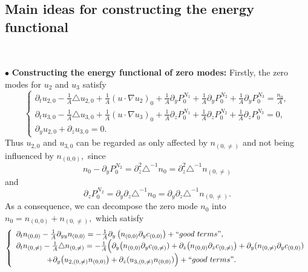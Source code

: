 \documentclass[12pt, reqno]{amsart}
\numberwithin{equation}{section}
\begin{document}
	
	\subsection{Main ideas for constructing the energy functional}\
	
	$\bullet$ {\bf Constructing the energy functional of zero modes:}
	Firstly, the zero modes for $u_{2}$ and $u_3$ satisfy 
	\begin{equation*}
		\left\{
		\begin{array}{lr}
			\partial_tu_{2,0}-\frac{1}{A}\triangle u_{2,0}
			+\frac{1}{A}(u\cdot\nabla u_{2})_0
			+\frac{1}{A}\partial_yP^{N_1}_0
			+\frac{1}{A}\partial_y P^{N_2}_0+\frac{1}{A}\partial_y P^{N_3}_0=\frac{n_0}{A}, \\
			\partial_tu_{3,0}-\frac{1}{A}\triangle u_{3,0}
			+\frac{1}{A}(u\cdot\nabla u_3)_0
			+\frac{1}{A}\partial_zP^{N_1}_0
			+\frac{1}{A}\partial_z P^{N_2}_0
			+\frac{1}{A}\partial_z P^{N_3}_0=0,\\
			\partial_yu_{2,0}+\partial_zu_{3,0}=0.
		\end{array}
		\right.
	\end{equation*}	
	Thus $u_{2,0}$ and $u_{3,0}$ can be regarded as only affected by $n_{(0,\neq)}$
	and not being influenced by $n_{(0,0)},$ since  $$n_0-\partial_yP^{N_2}_{0}
	=\partial_z^2\triangle^{-1}n_{0}=\partial_z^2\triangle^{-1}n_{(0,\neq)}$$
	and
	$$\partial_zP^{N_2}_{0}=\partial_y\partial_z\triangle^{-1}n_0
	=\partial_y\partial_z\triangle^{-1}n_{(0,\neq)}.$$
	As a consequence, we can decompose the zero mode $n_{0}$ into $n_0=n_{(0,0)}+n_{(0,\neq)},$ which satisfy
	\begin{equation}\label{eq:n0'}
		\left\{
		\begin{array}{lr}
			\partial_t n_{(0,0)}-\frac{1}{A}\partial_{yy} n_{(0,0)}=-\frac{1}{A}\partial_{y}\left(n_{(0,0)}
			\partial_{y}c_{(0,0)}\right)+``{\rm good~terms}",\\
			\partial_t n_{(0,\neq)}-\frac{1}{A}\triangle n_{(0,\neq)}
			=-\frac{1}{A}\Big(\partial_y\big(n_{(0,0)}\partial_{y}c_{(0,\neq)})+\partial_z\big(n_{(0,0)}\partial_{z}c_{(0,\neq)}\big)
			+\partial_y(n_{(0,\neq)}\partial_{y}c_{(0,0)})\\
			\qquad\qquad+\partial_y\big(u_{2,(0,\neq)}n_{(0,0)}\big)
			+\partial_z(u_{3,(0,\neq)}n_{(0,0)})\Big)
			+``{\rm good~terms}".
		\end{array}
		\right.
	\end{equation}
	
\end{document}
